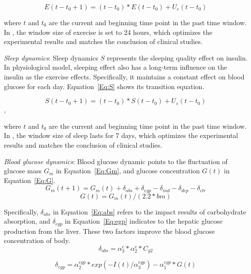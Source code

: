 \begin{equation}\label{Eq:E}
E(t-t_0+1)=(t-t_0)*E(t-t_0)+U_{e}(t-t_0)
\end{equation}

where $t$ and $t_0$ are the current and beginning time point in the past time window. In \sysname,
the window size of exercise is set to 24 hours, which optimizes the experimental results and matches the conclusion
of clinical studies.

\emph{Sleep dynamics}: Sleep dynamics $S$ represents the sleeping quality effect on insulin. In physiological model, sleeping
effect also has a long-term influence on the insulin as the exercise effects. Specifically, it maintains a constant effect on
blood glucose for each day. Equation~\ref{Eq:S} shows its transition equation.

\begin{equation}\label{Eq:S}
S(t-t_0+1)=(t-t_0)*S(t-t_0)+U_{s}(t-t_0)
\end{equation},

where $t$ and $t_0$ are the current and beginning time point in the past time window.
In \sysname, the window size of sleep lasts for 7 days, which optimizes the experimental results and matches the conclusion
of clinical studies.


\emph{Blood glucose dynamics}: Blood glucose dynamic points to the fluctuation of glucose mass $G_m$  in Equation~\ref{Eq:Gm},
and glucose concentration $G(t)$ in Equation~\ref{Eq:G}.
\begin{equation}\label{Eq:Gm}
G_m(t+1)=G_m(t)+\delta_{abs}+\delta_{egp}-\delta_{ind}-\delta_{dep}-\delta_{clr}
\end{equation}
\begin{equation}\label{Eq:G}
G(t)=G_m(t)/(2.2*bm)
\end{equation}

Specifically, $\delta_{abs}$ in Equation~\ref{Eq:abs} refers to the impact results of carbohydrate absorption, and
$\delta_{egp}$ in Equation~\ref{Eq:egp} indicates to the hepatic glucose production from
the liver. These two factors improve the blood glucose concentration of body.
\begin{equation}\label{Eq:abs}
  \delta_{abs}=\alpha_3^c*\alpha_2^c*C_{g2}
\end{equation}

\begin{equation}\label{Eq:egp}
  \delta_{egp}=\alpha_2^{egp}*exp(-I(t)/\alpha_3^{egp})-\alpha_1^{egp}*G(t)
\end{equation}

